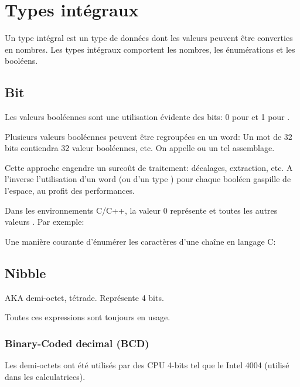 ﻿%
\section{Types intégraux}

Un type intégral est un type de données dont les valeurs peuvent être converties en nombres.
Les types intégraux comportent les nombres, les énumérations et les booléens.

\subsection{Bit}

Les valeurs booléennes sont une utilisation évidente des bits: 0 pour  et 1 pour .

Plusieurs valeurs booléennes peuvent être regroupées en un \gls{word}: Un mot de 32 bits contiendra 32 valeur booléennes, etc.
On appelle  ou  un tel assemblage.

Cette approche engendre un surcoût de traitement: décalages, extraction, etc.
A l'inverse l'utilisation d'un \gls{word} (ou d'un type ) pour chaque booléen gaspille de l'espace, au profit des performances.

Dans les environnements C/C++, la valeur 0 représente  et toutes les autres valeurs .
Par exemple:



Une manière courante d'énumérer les caractères d'une chaîne en langage C:



\subsection{Nibble}

\ac{AKA} demi-octet, tétrade.
Représente 4 bits.

Toutes ces expressions sont toujours en usage.

\subsubsection{Binary-Coded decimal (\ac{BCD})}
\label{BCD}


Les demi-octets ont été utilisés par des CPU 4-bits tel que le Intel 4004 (utilisé dans les calculatrices).

